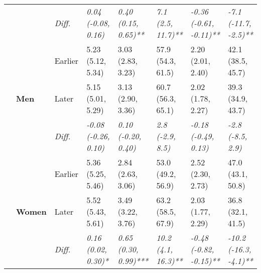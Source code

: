 \documentclass[12pt, a4paper]{article}
\begin{document}
\begin{appendices}
\begin{table}[!p]
{\begin{tabular}[t]{>{}l>{}lllllll}
        \cmidrule{3-8}
                                              &                                 & \cellcolor{gray!10}\em{Diff.} & \cellcolor{gray!10}\em{0.04 (-0.08, 0.16)}  & \cellcolor{gray!10}\em{0.40 (0.15, 0.65)**}  & \cellcolor{gray!10}\em{7.1 (2.5, 11.7)**}   & \cellcolor{gray!10}\em{-0.36 (-0.61, -0.11)**}  & \cellcolor{gray!10}\em{-7.1 (-11.7, -2.5)**}   \\
        \cmidrule{2-8}
                                              & \multirow{3}{*}{\textbf{Men}}   & Earlier                       & 5.23 (5.12, 5.34)                           & 3.03 (2.83, 3.23)                            & 57.9 (54.3, 61.5)                           & 2.20 (2.01, 2.40)                               & 42.1 (38.5, 45.7)                              \\
        \cmidrule{3-8}
                                              &                                 & Later                         & 5.15 (5.01, 5.29)                           & 3.13 (2.90, 3.36)                            & 60.7 (56.3, 65.1)                           & 2.02 (1.78, 2.27)                               & 39.3 (34.9, 43.7)                              \\
        \cmidrule{3-8}
                                              &                                 & \cellcolor{gray!10}\em{Diff.} & \cellcolor{gray!10}\em{-0.08 (-0.26, 0.10)} & \cellcolor{gray!10}\em{0.10 (-0.20, 0.40)}   & \cellcolor{gray!10}\em{2.8 (-2.9, 8.5)}     & \cellcolor{gray!10}\em{-0.18 (-0.49, 0.13)}     & \cellcolor{gray!10}\em{-2.8 (-8.5, 2.9)}       \\
        \cmidrule{2-8}
                                              & \multirow{3}{*}{\textbf{Women}} & Earlier                       & 5.36 (5.25, 5.46)                           & 2.84 (2.63, 3.06)                            & 53.0 (49.2, 56.9)                           & 2.52 (2.30, 2.73)                               & 47.0 (43.1, 50.8)                              \\
        \cmidrule{3-8}
                                              &                                 & Later                         & 5.52 (5.43, 5.61)                           & 3.49 (3.22, 3.76)                            & 63.2 (58.5, 67.9)                           & 2.03 (1.77, 2.29)                               & 36.8 (32.1, 41.5)                              \\
        \cmidrule{3-8}
                                              &                                 & \cellcolor{gray!10}\em{Diff.} & \cellcolor{gray!10}\em{0.16 (0.02, 0.30)*}  & \cellcolor{gray!10}\em{0.65 (0.30, 0.99)***} & \cellcolor{gray!10}\em{10.2 (4.1, 16.3)**}  & \cellcolor{gray!10}\em{-0.48 (-0.82, -0.15)**}  & \cellcolor{gray!10}\em{-10.2 (-16.3, -4.1)**}  \\

\end{tabular}}
\end{table}
\end{appendices}
\end{document}
